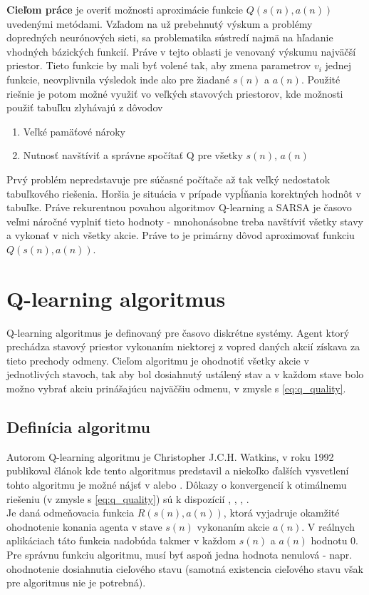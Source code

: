 {\bf Cieľom práce} je overiť možnosti aproximácie funkcie $Q(s(n), a(n))$
uvedenými metódami. Vzľadom na už prebehnutý výskum a problémy dopredných
neurónových sieti, sa problematika sústredí najmä
na hľadanie vhodných bázických funkcií. Práve v tejto oblasti je venovaný výskumu
najväčší priestor. Tieto funkcie by mali byť volené tak, aby zmena parametrov $v_i$ jednej
funkcie, neovplivnila výsledok inde ako pre žiadané $s(n)$ a $a(n)$.
Použité riešnie je potom možné využiť vo veľkých stavových priestorov, kde možnosti použiť tabuľku
zlyhávajú z dôvodov
\begin{enumerate}
  \item Veľké pamäťové nároky
  \item Nutnosť navštíviť a správne spočítať Q pre všetky $s(n)$, $a(n)$
\end{enumerate}
Prvý problém nepredstavuje pre súčasné počítače až tak veľký nedostatok tabuľkového
riešenia. Horšia je situácia v prípade vypĺňania korektných hodnôt v tabuľke. Práve rekurentnou
povahou algoritmov Q-learning a SARSA je časovo veľmi náročné vyplniť tieto hodnoty -
mnohonásobne treba navštíviť všetky stavy a vykonať v nich všetky akcie. Práve to je
primárny dôvod aproximovať funkciu $Q(s(n), a(n))$.


\section{Q-learning algoritmus}

Q-learning algoritmus je definovaný pre časovo diskrétne systémy.
Agent ktorý prechádza stavový priestor vykonaním niektorej z vopred daných
akcií získava za tieto prechody odmeny. Cieľom algoritmu je ohodnotiť všetky akcie
v jednotlivých stavoch, tak aby bol dosiahnutý ustálený stav a v každom stave
bolo možno vybrať akciu prinášajúcu najväčšiu odmenu, v zmysle
s \ref{eq:q_quality}.

\subsection{Definícia algoritmu}

Autorom Q-learning algoritmu je Christopher J.C.H. Watkins, v roku 1992 publikoval
článok kde tento algoritmus predstavil \cite{bib:q_learning_watkins} a niekoľko ďalších
vysvetlení tohto algoritmu je možné nájsť v \cite{bib:q_tutorial_01} alebo
\cite{bib:q_tutorial_02}. Dôkazy o konvergencií k otimálnemu riešeniu (v zmysle
s \ref{eq:q_quality}) sú k dispozícií \cite{bib:q_proof_01}, \cite{bib:q_proof_02},
\cite{bib:q_proof_03}, \cite{bib:q_proof_04}.
\\
Je daná odmeňovacia funkcia $R(s(n),a(n))$, ktorá vyjadruje okamžité ohodnotenie konania
agenta v stave $s(n)$ vykonaním akcie $a(n)$. V reálnych aplikáciach táto funkcia nadobúda takmer v každom
$s(n)$ a $a(n)$ hodnotu $0$. Pre správnu funkciu algoritmu, musí byť aspoň jedna hodnota
nenulová - napr. ohodnotenie dosiahnutia cieľového stavu (samotná existencia cieľového
stavu však pre algoritmus nie je potrebná).

